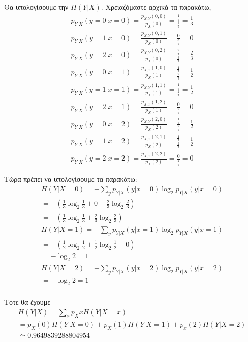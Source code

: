 \documentclass[12pt]{article}
\numberwithin{equation}{section}
\begin{document}
{{		Θα υπολογίσουμε την $H(Y|X)$.
		Χρειαζόμαστε αρχικά τα παρακάτω,
		\begin{gather*} 
			p_{Y|X}(y=0|x=0) = \frac{p_{X,Y}(0,0)}{p_{X}(0)} = \frac{\frac{1}{7}}{\frac{3}{7}} =\frac{1}{3} \\
			p_{Y|X}(y=1|x=0) = \frac{p_{X,Y}(0,1)}{p_{X}(0)} = \frac{0}{\frac{3}{7}} = 0 \\
			p_{Y|X}(y=2|x=0) = \frac{p_{X,Y}(0,2)}{p_{X}(0)} = \frac{\frac{2}{7}}{\frac{3}{7}} =\frac{2}{3} \\
			p_{Y|X}(y=0|x=1) = \frac{p_{X,Y}(1,0)}{p_{X}(1)} = \frac{\frac{1}{7}}{\frac{2}{7}} =\frac{1}{2} \\
			p_{Y|X}(y=1|x=1) = \frac{p_{X,Y}(1,1)}{p_{X}(1)} = \frac{\frac{1}{7}}{\frac{2}{7}} =\frac{1}{2} \\
			p_{Y|X}(y=2|x=1) = \frac{p_{X,Y}(1,2)}{p_{X}(1)} = \frac{0}{\frac{2}{7}} = 0 \\
			p_{Y|X}(y=0|x=2) = \frac{p_{X,Y}(2,0)}{p_{X}(2)} = \frac{\frac{1}{7}}{\frac{2}{7}} =\frac{1}{2} \\
			p_{Y|X}(y=1|x=2) = \frac{p_{X,Y}(2,1)}{p_{X}(2)} = \frac{\frac{1}{7}}{\frac{2}{7}} =\frac{1}{2} \\
			p_{Y|X}(y=2|x=2) = \frac{p_{X,Y}(2,2)}{p_{X}(2)} = \frac{0}{\frac{2}{7}} = 0
		\end{gather*}		
	}}

	Τώρα πρέπει να υπολογίσουμε τα παρακάτω: 
	\begin{gather*} 
		H(Y|X=0) = - \sum_{y}p_{Y|X}(y|x=0)\log_{2}p_{Y|X}(y|x=0) \\
		= -(\frac{1}{3}\log_{2}\frac{1}{3} + 0 + \frac{2}{3}\log_{2}\frac{2}{3}) \\
		= -(\frac{1}{3}\log_{2}\frac{1}{3} + \frac{2}{3}\log_{2}\frac{2}{3}) \\
		H(Y|X=1) = - \sum_{y}p_{Y|X}(y|x=1)\log_{2}p_{Y|X}(y|x=1) \\
		= -(\frac{1}{2}\log_{2}\frac{1}{2} + \frac{1}{2}\log_{2}\frac{1}{2} + 0) \\
		= - \log_{2}2 = 1\\
		H(Y|X=2) = - \sum_{y}p_{Y|X}(y|x=2)\log_{2}p_{Y|X}(y|x=2) \\
		= - \log_{2}2 = 1\\
	\end{gather*}
	
	Τότε θα έχουμε
	\begin{gather*} 
		H(Y|X) = \sum_{x}p_{X}xH(Y|X=x) \\
		= p_{X}(0)H(Y|X=0) + p_{X}(1)H(Y|X=1) + p_{x}(2)H(Y|X=2) \\
		\simeq 0.9649839288804954
	\end{gather*}
	
\end{document}
